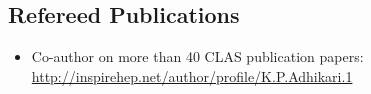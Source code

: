 \documentclass[10pt, letterpaper]{article}
\newcommand{\years}[1]{\marginnote{\small #1}} %
\newcommand{\publication}[2]{
\years{#1} \bibentry{#2}. \par\vspace{0.8mm}
}
\begin{document}
\subsection*{Refereed Publications}
\noindent
\begin{itemize}
\item Co-author on more than 40 CLAS publication papers: \\
\url{http://inspirehep.net/author/profile/K.P.Adhikari.1}%
\end{itemize}






\end{document}
